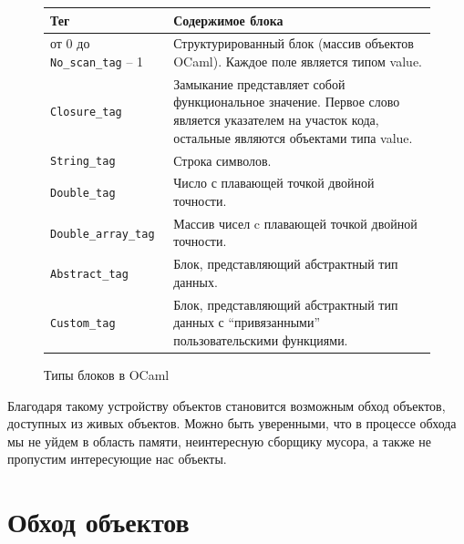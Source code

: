 \begin{figure}[t]
    \begin{tabular}{|l| p{6cm}|}
    \hline
    Тег & Содержимое блока \\
    \hline
    от 0 до \texttt{No\_scan\_tag} -- 1 & Структурированный блок (массив объектов OCaml). Каждое поле является типом value.\\
    \hline
    \texttt{Closure\_tag} & Замыкание представляет собой функциональное значение. Первое слово является указателем на участок кода,
    остальные являются объектами типа value.\\
    \hline
    \texttt{String\_tag} & Строка символов. \\
    \hline
    \texttt{Double\_tag} & Число с плавающей точкой двойной точности. \\
    \hline
    \texttt{Double\_array\_tag} & Массив чисел c плавающей точкой двойной точности. \\
    \hline
    \texttt{Abstract\_tag} & Блок, представляющий абстрактный тип данных. \\
    \hline
    \texttt{Custom\_tag} & Блок, представляющий абстрактный тип данных
    с ``привязанными'' пользовательскими функциями. \\
    \hline
    \end{tabular}
    \caption{Типы блоков в OCaml}
    \label{block_types}
\end{figure}

Благодаря такому устройству объектов становится возможным обход объектов, доступных из живых объектов. Можно быть уверенными,
что в процессе обхода мы не уйдем в область памяти, неинтересную сборщику мусора, а также не пропустим интересующие нас объекты. 

\section{Обход объектов}

